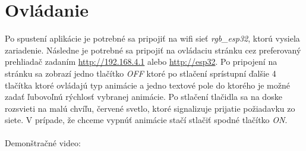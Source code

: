 \documentclass[a4paper, 11pt]{article}
\begin{document}
\section{Ovládanie}
Po spustení aplikácie je potrebné sa pripojiť na wifi sieť \textit{rgb\_esp32}, ktorú vysiela zariadenie. Následne je potrebné sa pripojiť na ovládaciu stránku cez preferovaný prehliadač zadaním \href{http://192.168.4.1}{http://192.168.4.1} alebo \href{http://esp32}{http://esp32}. Po pripojení na stránku sa zobrazí jedno tlačítko \textit{OFF} ktoré po stlačení sprístupní ďalšie 4 tlačítka ktoré ovládajú typ animácie a jedno textové pole do ktorého je možné zadať ľubovoľnú rýchlosť vybranej animácie. Po stlačení tlačidla sa na doske rozsvieti na malú chvíľu, červené svetlo, ktoré signalizuje prijatie požiadavku zo siete. V prípade, že chceme vypnúť animácie stačí stlačiť spodné tlačítko \textit{ON}. \\ \\
Demonštračné video:
\href{https://drive.google.com/file/d/1CSQYQpGuNmzeRpa_-Hc1tSbUmXrdMQXM/view?usp=share_link}{\color{blue}{Demo}}
\end{document}
